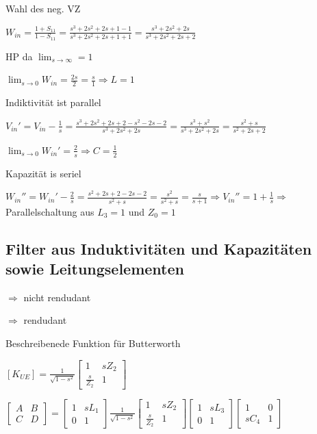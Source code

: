 Wahl des neg. VZ 
\begin{pitemize}
    \item $W_{in} = \frac{1 + S_{11}}{1 - S_{11}} = \frac{s^3 + 2s^2 + 2s + 1 - 1}{s^3 + 2s^2 + 2s + 1 + 1} = \frac{s^3 + 2s^2 + 2s}{s^3 + 2s^2 + 2s + 2}$
    \item HP da $\lim_{s\rightarrow\infty} = 1$
    \item $\lim_{s\rightarrow0}\limits W_{in}= \frac{2s}{2} = \frac{s}{1} \Rightarrow L = 1$
    \item Indiktivität ist parallel 
    \item $V_{in}' = V_{in} - \frac{1}{s} = \frac{s^3 + 2s^2 + 2s + 2 - s^2 - 2s - 2}{s^3 + 2s^2 + 2s} = \frac{s^3 + s^2}{s^3 + 2s^2 + 2s} = \frac{s^2 + s}{s^2 + 2s + 2}$
    \item $\lim_{s\rightarrow0}\limits W_{in}' = \frac{2}{s} \Rightarrow C = \frac{1}{2}$
    \item Kapazität is seriel 
    \item $W_{in}'' = W_{in}' - \frac{2}{s} = \frac{s^2 + 2s + 2 - 2s - 2}{s^2 + s} = \frac{s^2}{s^2 +s} = \frac{s}{s + 1} \Rightarrow V_{in}'' = 1 + \frac{1}{s} \Rightarrow$ Parallelschaltung aus $L_3 = 1$ und $Z_0 = 1$ 
    \item {}
\end{pitemize}





\subsection{Filter aus Induktivitäten und Kapazitäten sowie Leitungselementen}
 $\Rightarrow$ nicht rendudant

 $\Rightarrow$ rendudant

Beschreibenede Funktion für Butterworth

$\left[K_{UE}\right] = \frac{1}{\sqrt{1 - s^2}}\begin{bmatrix}
    1 & sZ_2 \\ \frac{s}{Z_2} & 1
\end{bmatrix}$

$\begin{bmatrix}
    A & B \\ C & D
\end{bmatrix} = \begin{bmatrix}
    1 & sL_1 \\ 0 & 1
\end{bmatrix} \frac{1}{\sqrt{1 - s^2}} \begin{bmatrix}
    1 & sZ_2 \\ \frac{s}{Z_2} & 1
\end{bmatrix}\begin{bmatrix}
    1 & sL_3 \\ 0 & 1
\end{bmatrix}\begin{bmatrix}
    1 & 0 \\ sC_4 & 1
\end{bmatrix}$

